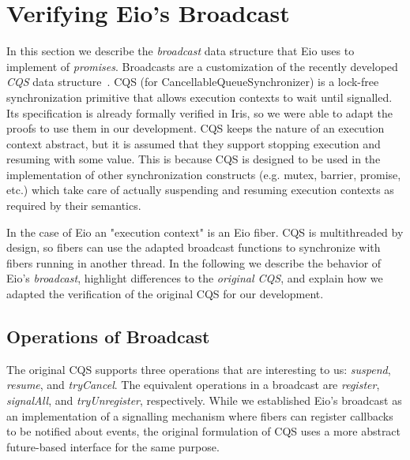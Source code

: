 \section{Verifying Eio's Broadcast}
\label{sec:broadcast}


In this section we describe the \emph{broadcast} data structure that Eio uses to implement of \emph{promises}.
Broadcasts are a customization of the recently developed \emph{CQS} data structure~\cite{koval2023cqs}.
CQS (for CancellableQueueSynchronizer) is a lock-free synchronization primitive that allows execution contexts to wait until signalled.
Its specification is already formally verified in Iris, so we were able to adapt the proofs to use them in our development.
CQS keeps the nature of an execution context abstract, but it is assumed that they support stopping execution and resuming with some value.
This is because CQS is designed to be used in the implementation of other synchronization constructs (e.g. mutex, barrier, promise, etc.) which take care of actually suspending and resuming execution contexts as required by their semantics.


In the case of Eio an "execution context" is an Eio fiber.
CQS is multithreaded by design, so fibers can use the adapted broadcast functions to synchronize with fibers running in another thread.
In the following we describe the behavior of Eio's \emph{broadcast}, highlight differences to the \emph{original CQS}, and explain how we adapted the verification of the original CQS for our development.

\subsection{Operations of Broadcast}
\label{sec:broadcast-operations}


The original CQS supports three operations that are interesting to us: \emph{suspend}, \emph{resume}, and \emph{tryCancel}.
The equivalent operations in a broadcast are \emph{register}, \emph{signalAll}, and \emph{tryUnregister}, respectively.
While we established Eio's broadcast as an implementation of a signalling mechanism where fibers can register callbacks to be notified about events, the original formulation of CQS uses a more abstract future-based interface for the same purpose.

